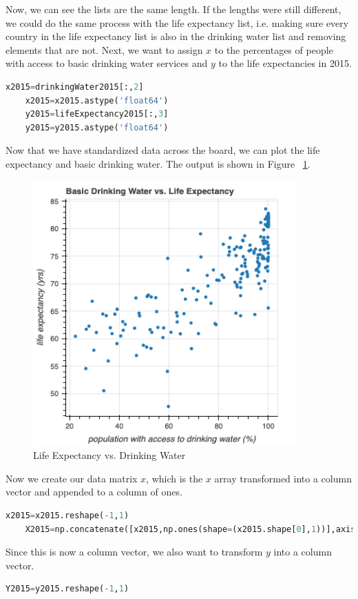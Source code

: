 \documentclass[12pt]{article}
\begin{document}
Now, we can see the lists are the same length. If the lengths were still different, we could do the same process with the life expectancy list, i.e. making sure every country in the life expectancy list is also in the drinking water list and removing elements that are not. Next, we want to assign $x$ to the percentages of people with access to basic drinking water services and $y$ to the life expectancies in 2015.
\begin{lstlisting}[language=Python]
    x2015=drinkingWater2015[:,2]
    x2015=x2015.astype('float64')
    y2015=lifeExpectancy2015[:,3]
    y2015=y2015.astype('float64')
\end{lstlisting}

Now that we have standardized data across the board, we can plot the life expectancy and basic drinking water. The output is shown in Figure ~\ref{fig3}.
\begin{figure}
    \centering
    \includegraphics[width=4in]{Figures/figure1.png}
    \caption{Life Expectancy vs. Drinking Water}
    \label{fig3}
\end{figure}

Now we create our data matrix $x$, which is the $x$ array transformed into a column vector and appended to a column of ones.
\begin{lstlisting}[language=Python]
    x2015=x2015.reshape(-1,1)
    X2015=np.concatenate([x2015,np.ones(shape=(x2015.shape[0],1))],axis=1)
\end{lstlisting}

Since this is now a column vector, we also want to transform $y$ into a column vector.
\begin{lstlisting}[language=Python]
    Y2015=y2015.reshape(-1,1)
\end{lstlisting}
\end{document}
